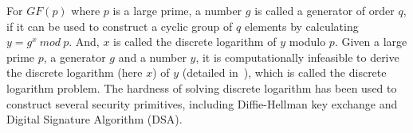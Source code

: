 For $GF(p)$ where $p$ is a large prime, a number $g$ is called a generator of order $q$, if it can be used to construct a cyclic  group of $q$ elements by calculating $y=g^x \ mod\ p$.
And, $x$ is called the discrete logarithm of $y$ modulo $p$. Given a large prime $p$, a generator $g$ and a number $y$, it is computationally infeasible to derive the discrete logarithm (here $x$) of $y$ (detailed in~\cite{WXWM}), which is called the discrete logarithm problem. The hardness of solving discrete logarithm has been used to construct several security primitives, including Diffie-Hellman key exchange and Digital Signature Algorithm (DSA).


